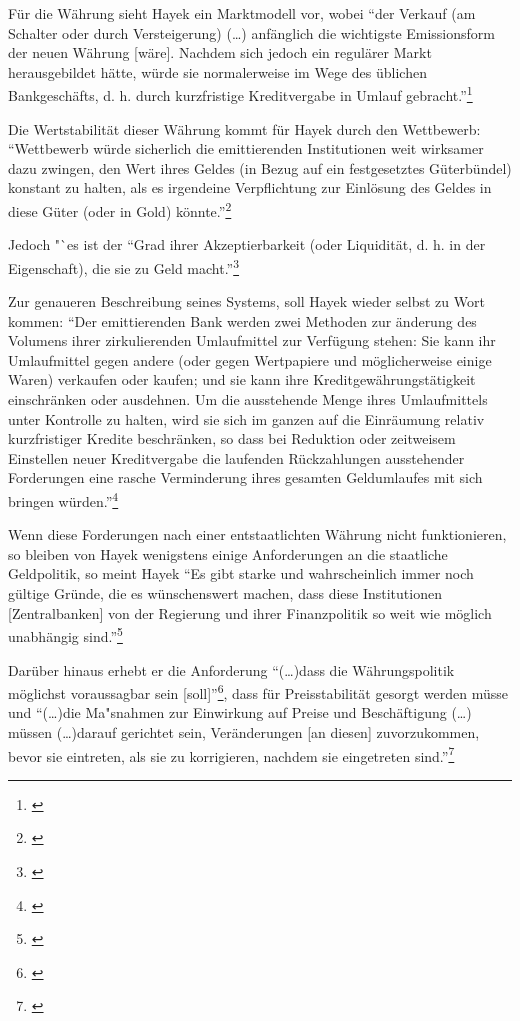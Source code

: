 \documentclass[
        onecolumn,
        a4paper,
        abstracton,
        parskip=half
        ,final
        ]{scrartcl}
\begin{document}
F{\"u}r die W{\"a}hrung sieht Hayek ein Marktmodell vor, wobei "`der Verkauf (am Schalter oder durch Versteigerung) (\ldots) anf{\"a}nglich die wichtigste Emissionsform der neuen W{\"a}hrung [w{\"a}re]. Nachdem sich jedoch ein regul{\"a}rer Markt herausgebildet h{\"a}tte, w{\"u}rde sie normalerweise im Wege des {\"u}blichen Bankgesch{\"a}fts, d. h. durch kurzfristige Kreditvergabe in Umlauf gebracht."'\footnote[418]{\citep*[S.31]{Hayek1977}}

Die Wertstabilit{\"a}t dieser W{\"a}hrung kommt f{\"u}r Hayek durch den Wettbewerb: "`Wettbewerb w{\"u}rde sicherlich die emittierenden Institutionen weit wirksamer dazu zwingen, den Wert ihres Geldes (in Bezug auf ein festgesetztes G{\"u}terb{\"u}ndel) konstant zu halten, als es irgendeine Verpflichtung zur Einl{\"o}sung des Geldes in diese G{\"u}ter (oder in Gold) k{\"o}nnte."'\footnote[419]{\citep*[S.32]{Hayek1977}}

Jedoch "`es ist der "`Grad ihrer Akzeptierbarkeit (oder Liquidit{\"a}t, d. h. in der Eigenschaft), die sie zu Geld macht."'\footnote[420]{\citep*[S.40]{Hayek1977}}

Zur genaueren Beschreibung seines Systems, soll Hayek wieder selbst zu Wort kommen: "`Der emittierenden Bank werden zwei Methoden zur {\"a}nderung des Volumens ihrer zirkulierenden Umlaufmittel zur Verf{\"u}gung stehen: Sie kann ihr Umlaufmittel gegen andere (oder gegen Wertpapiere und m{\"o}glicherweise einige Waren) verkaufen oder kaufen; und sie kann ihre Kreditgew{\"a}hrungst{\"a}tigkeit einschr{\"a}nken oder ausdehnen. Um die ausstehende Menge ihres Umlaufmittels unter Kontrolle zu halten, wird sie sich im ganzen auf die Einr{\"a}umung relativ kurzfristiger Kredite beschr{\"a}nken, so dass bei Reduktion oder zeitweisem Einstellen neuer Kreditvergabe die laufenden R{\"u}ckzahlungen ausstehender Forderungen eine rasche Verminderung ihres gesamten Geldumlaufes mit sich bringen w{\"u}rden."'\footnote[421]{\citep*[S.45]{Hayek1977}}

Wenn diese Forderungen nach einer entstaatlichten W{\"a}hrung nicht funktionieren, so bleiben von Hayek wenigstens einige Anforderungen an die staatliche Geldpolitik, so meint Hayek
"`Es gibt starke und wahrscheinlich immer noch g{\"u}ltige Gr{\"u}nde, die es w{\"u}nschenswert machen, dass diese Institutionen [Zentralbanken] von der Regierung und ihrer Finanzpolitik so weit wie m{\"o}glich unabh{\"a}ngig sind."'\footnote[422]{\citep*[S.412]{hayek1971}}

Dar{\"u}ber hinaus erhebt er die Anforderung "`(\ldots)dass die W{\"a}hrungspolitik m{\"o}glichst voraussagbar sein [soll]"'\footnote[423]{\citep*[S.420]{hayek1971}}, dass f{\"u}r Preisstabilit{\"a}t gesorgt werden m{\"u}sse und "`(\ldots)die Ma{"s}nahmen zur Einwirkung auf Preise und Besch{\"a}ftigung (\ldots) m{\"u}ssen (\ldots)darauf gerichtet sein, Ver{\"a}nderungen [an diesen] zuvorzukommen, bevor sie eintreten, als sie zu korrigieren, nachdem sie eingetreten sind."'\footnote[425]{\citep*[S.422]{hayek1971}}
\end{document}
